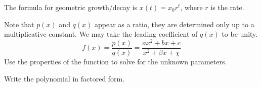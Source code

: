 {\begin{Hint}
\label{hint geometric growth bacteria}
The formula for geometric growth/decay is $x(t) = x_0 r^t$, where $r$ is 
the rate.
\end{Hint}



\begin{Hint}
\label{hint rational quadratic}
Note that $p(x)$ and $q(x)$ appear as a ratio, they are determined only up to
a multiplicative constant.  We may take the leading coefficient of $q(x)$ to
be unity.
\[
f(x) = \frac{p(x)}{q(x)} = \frac{a x^2 + b x + c}{x^2 + \beta x + \chi}
\]
Use the properties of the function to solve for the unknown parameters.
\end{Hint}






\begin{Hint}
\label{hint polynomial 100}
Write the polynomial in factored form.
\end{Hint}













\raggedbottom
}
